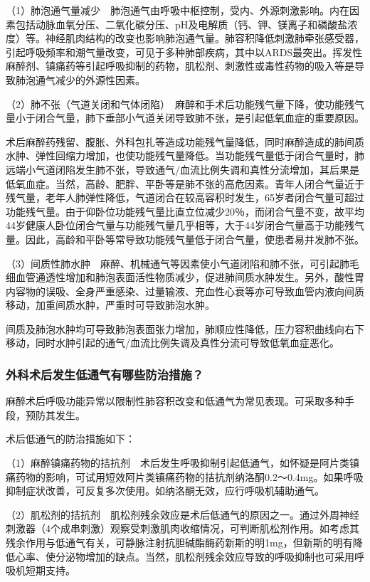 （1）肺泡通气量减少　肺泡通气由呼吸中枢控制，受内、外源刺激影响。内在因素包括动脉血氧分压、二氧化碳分压、pH及电解质（钙、钾、镁离子和磷酸盐浓度）等。神经肌肉结构的改变也影响肺泡通气量。肺容积降低刺激肺牵张感受器，引起呼吸频率和潮气量改变，可见于多种肺部疾病，其中以ARDS最突出。挥发性麻醉剂、镇痛药等引起呼吸抑制的药物，肌松剂、刺激性或毒性药物的吸入等是导致肺泡通气减少的外源性因素。

（2）肺不张（气道关闭和气体闭陷）　麻醉和手术后功能残气量下降，使功能残气量小于闭合气量，肺下垂部小气道关闭导致肺不张，是引起低氧血症的重要原因。

术后麻醉药残留、腹胀、外科包扎等造成功能残气量降低，同时麻醉造成的肺间质水肿、弹性回缩力增加，也使功能残气量降低。当功能残气量低于闭合气量时，肺远端小气道闭陷发生肺不张，导致通气/血流比例失调和真性分流增加，其后果是低氧血症。当然，高龄、肥胖、平卧等是肺不张的高危因素。青年人闭合气量近于残气量，老年人肺弹性降低，气道闭合在较高容积时发生，65岁者闭合气量可超过功能残气量。由于仰卧位功能残气量比直立位减少20％，而闭合气量不变，故平均44岁健康人卧位闭合气量与功能残气量几乎相等，大于44岁闭合气量高于功能残气量。因此，高龄和平卧等常导致功能残气量低于闭合气量，使患者易并发肺不张。

（3）间质性肺水肿　麻醉、机械通气等因素使小气道闭陷和肺不张，可引起肺毛细血管通透性增加和肺泡表面活性物质减少，促进肺间质水肿发生。另外，酸性胃内容物的误吸、全身严重感染、过量输液、充血性心衰等亦可导致血管内液向间质移动，加重间质水肿，严重时可导致肺泡水肿。

间质及肺泡水肿均可导致肺泡表面张力增加，肺顺应性降低，压力容积曲线向右下移动，同时水肿引起的通气/血流比例失调及真性分流可导致低氧血症恶化。

\subsubsection{外科术后发生低通气有哪些防治措施？}

麻醉术后呼吸功能异常以限制性肺容积改变和低通气为常见表现。可采取多种手段，预防其发生。

术后低通气的防治措施如下：

（1）麻醉镇痛药物的拮抗剂　术后发生呼吸抑制引起低通气，如怀疑是阿片类镇痛药物的影响，可试用短效阿片类镇痛药物的拮抗剂纳洛酮0.2～0.4mg。如果呼吸抑制症状改善，可反复多次使用。如纳洛酮无效，应行呼吸机辅助通气。

（2）肌松剂的拮抗剂　肌松剂残余效应是术后低通气的原因之一。通过外周神经刺激器（4个成串刺激）观察受刺激肌肉收缩情况，可判断肌松剂作用。如考虑其残余作用与低通气有关，可静脉注射抗胆碱酯酶药新斯的明1mg，但新斯的明有降低心率、使分泌物增加的缺点。当然，肌松剂残余效应导致的呼吸抑制也可采用呼吸机短期支持。

